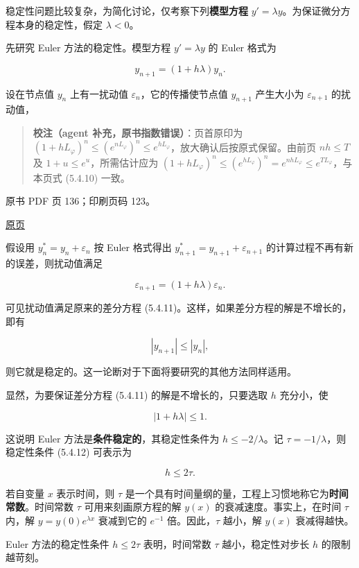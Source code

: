 稳定性问题比较复杂，为简化讨论，仅考察下列\textbf{模型方程} \(y'=\lambda y\)。为保证微分方程本身的稳定性，假定 \(\lambda<0\)。

先研究 Euler 方法的稳定性。模型方程 \(y'=\lambda y\) 的 Euler 格式为

\[
y_{n+1}=(1+h\lambda)y_n.\tag{5.4.11}
\]

设在节点值 \(y_n\) 上有一扰动值 \(\varepsilon_n\)，它的传播使节点值 \(y_{n+1}\) 产生大小为 \(\varepsilon_{n+1}\) 的扰动值，

\begin{quote}
\textbf{校注（agent 补充，原书指数错误）}：页首原印为 \((1+hL_\varphi)^n\leqslant(e^{nL_\varphi})^n\leqslant e^{hL_\varphi}\)，放大确认后按原式保留。由前页 \(nh\leqslant T\) 及 \(1+u\leqslant e^u\)，所需估计应为 \((1+hL_\varphi)^n\leqslant(e^{hL_\varphi})^n=e^{nhL_\varphi}\leqslant e^{TL_\varphi}\)，与本页式 (5.4.10) 一致。
\end{quote}

\clearpage

原书 PDF 页 136；印刷页码 123。

\href{source-images/pdf-136.jpeg}{原页}

假设用 \(y_n^*=y_n+\varepsilon_n\) 按 Euler 格式得出 \(y_{n+1}^*=y_{n+1}+\varepsilon_{n+1}\) 的计算过程不再有新的误差，则扰动值满足

\[
\varepsilon_{n+1}=(1+h\lambda)\varepsilon_n.
\]

可见扰动值满足原来的差分方程 (5.4.11)。这样，如果差分方程的解是不增长的，即有

\[
|y_{n+1}|\leqslant|y_n|,
\]

则它就是稳定的。这一论断对于下面将要研究的其他方法同样适用。

显然，为要保证差分方程 (5.4.11) 的解是不增长的，只要选取 \(h\) 充分小，使

\[
|1+h\lambda|\leqslant1.\tag{5.4.12}
\]

这说明 Euler 方法是\textbf{条件稳定的}，其稳定性条件为 \(h\leqslant-2/\lambda\)。记 \(\tau=-1/\lambda\)，则稳定性条件 (5.4.12) 可表示为

\[
h\leqslant2\tau.\tag{5.4.13}
\]

若自变量 \(x\) 表示时间，则 \(\tau\) 是一个具有时间量纲的量，工程上习惯地称它为\textbf{时间常数}。时间常数 \(\tau\) 可用来刻画原方程的解 \(y(x)\) 的衰减速度。事实上，在时间 \(\tau\) 内，解 \(y=y(0)e^{\lambda x}\) 衰减到它的 \(e^{-1}\) 倍。因此，\(\tau\) 越小，解 \(y(x)\) 衰减得越快。

Euler 方法的稳定性条件 \(h\leqslant2\tau\) 表明，时间常数 \(\tau\) 越小，稳定性对步长 \(h\) 的限制越苛刻。

